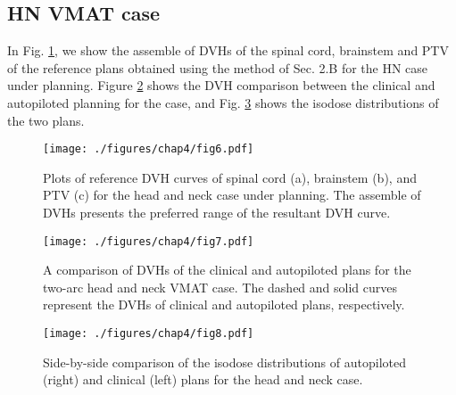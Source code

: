 \subsection{HN VMAT case}
In Fig. \ref{fig4.6}, we show the assemble of DVHs of the spinal cord, brainstem and PTV of the reference plans obtained using the method of Sec. 2.B for the HN case under planning. Figure \ref{fig4.7} shows the DVH comparison between the clinical and autopiloted planning for the case, and Fig. \ref{fig4.8} shows the isodose distributions of the two plans.

\begin{figure}
	\centering
	\texttt{[image: ./figures/chap4/fig6.pdf]}
	\caption{Plots of reference DVH curves of spinal cord (a), brainstem (b), and PTV (c) for the head and neck case under planning. The assemble of DVHs presents the preferred range of the resultant DVH curve. 
	\label{fig4.6}}
    \end{figure}
   
\begin{figure}
	\centering
	\texttt{[image: ./figures/chap4/fig7.pdf]}
	\caption{A comparison of DVHs of the clinical and autopiloted plans for the two-arc head and neck VMAT case. The dashed and solid curves represent the DVHs of clinical and autopiloted plans, respectively. 
	\label{fig4.7}}
    \end{figure}
    
\begin{figure}
	\centering
	\texttt{[image: ./figures/chap4/fig8.pdf]}
	\caption{Side-by-side comparison of the isodose distributions of autopiloted (right) and clinical (left) plans for the head and neck case. 
	\label{fig4.8}}
    \end{figure}
     
